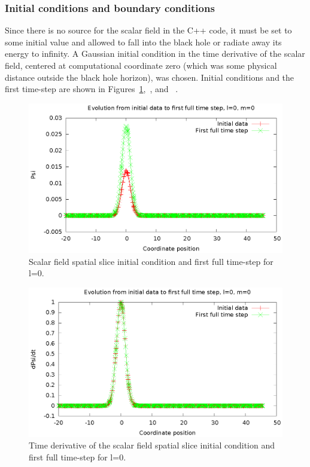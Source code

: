 \subsubsection{Initial conditions and boundary conditions}
Since there is no source for the scalar field in the C++ code, it must be set to some initial value and allowed to fall into the black hole or radiate away its energy to infinity. A Gaussian initial condition in the time derivative of the scalar field, centered at computational coordinate zero (which was some physical distance outside the black hole horizon), was chosen. Initial conditions and the first time-step are shown in Figures~\ref{psi0},~\cite{rho0}, and ~\cite{phi0}.


\begin{figure}
  \includegraphics{psi1dl0}
  \caption{Scalar field spatial slice initial condition and first full time-step for l=0.}
  \label{psi0}
\end{figure}

\begin{figure}
  \includegraphics{rho1dl0}
  \caption{Time derivative of the scalar field spatial slice initial condition and first full time-step for l=0.}
  \label{rho0}
\end{figure}

